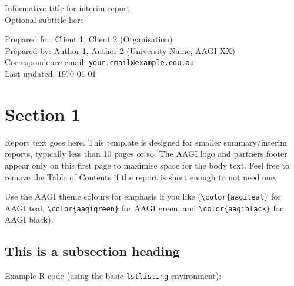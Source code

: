\documentclass[12pt]{article}
\newcommand{\myuniversity}{University Name}
\newcommand{\myaaginode}{AAGI-XX}
\begin{document}
  \pagestyle{otherpages}

  \thispagestyle{firstpage}
  \afterpage{\aftergroup\restoregeometry}
  
  \vspace*{0.6cm}
  {\Large\sbf%
    Informative title for interim report  %
  }\\[2pt]
  {\large%
    Optional subtitle here  %
  }
  
  Prepared for: Client 1, Client 2 (Organisation)\\[2pt]  
  Prepared by: Author 1, Author 2 ({\myuniversity}, {\myaaginode})\\[-20pt]
  
  \newcommand{\myemail}{your.email@example.edu.au}
  Correspondence email: \texttt{\href{mailto:{\myemail}}{\myemail}}\\[-20pt]
  
  Last updated: \today
  
  \setcounter{page}{1}
  \tableofcontents

  \section{Section 1}
  
  Report text goes here. This template is designed for smaller summary/interim
  reports, typically less than 10 pages or so. The AAGI logo and partners footer
  appear only on this first page to maximise space for the body text. Feel free
  to remove the Table of Contents if the report is short enough to not need one.
  
  Use the AAGI theme colours for emphasis if you like (\verb|\color{aagiteal}|
  for {\color{aagiteal}AAGI teal}, \verb|\color{aagigreen}| for
  {\color{aagigreen}AAGI green}, and \verb|\color{aagiblack}| for
  {\color{aagiblack}AAGI black}).
  
  \subsection{This is a subsection heading}
  
  Example R code (using the basic \texttt{lstlisting} environment):
\end{document}
